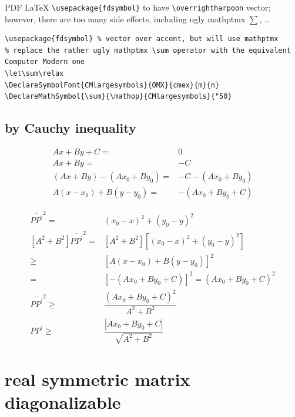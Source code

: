 \documentclass[
]{book}
\theoremstyle{definition}
\theoremstyle{definition}
\theoremstyle{definition}
\theoremstyle{definition}
\theoremstyle{remark}
\begin{document}
PDF LaTeX \texttt{\textbackslash{}usepackage\{fdsymbol\}} to have \texttt{\textbackslash{}overrightharpoon} vector; however, there are too many side effects, including ugly mathptmx \(\sum\), \ldots{}

\begin{verbatim}
\usepackage{fdsymbol} % vector over accent, but will use mathptmx
% replace the rather ugly mathptmx \sum operator with the equivalent Computer Modern one
\let\sum\relax
\DeclareSymbolFont{CMlargesymbols}{OMX}{cmex}{m}{n}
\DeclareMathSymbol{\sum}{\mathop}{CMlargesymbols}{"50}
\end{verbatim}

\hypertarget{by-cauchy-inequality}{%
\section{by Cauchy inequality}\label{by-cauchy-inequality}}

\[
\begin{aligned}
Ax+By+C= & 0\\
Ax+By= & -C\\
\left(Ax+By\right)-\left(Ax_{0}+By_{0}\right)= & -C-\left(Ax_{0}+By_{0}\right)\\
A\left(x-x_{0}\right)+B\left(y-y_{0}\right)= & -\left(Ax_{0}+By_{0}+C\right)
\end{aligned}
\]

\[
\begin{aligned}
\overline{PP^{\prime}}^{2}= & \left(x_{0}-x\right)^{2}+\left(y_{0}-y\right)^{2}\\
\left[A^{2}+B^{2}\right]\overline{PP^{\prime}}^{2}= & \left[A^{2}+B^{2}\right]\left[\left(x_{0}-x\right)^{2}+\left(y_{0}-y\right)^{2}\right]\\
\ge & \left[A\left(x-x_{0}\right)+B\left(y-y_{0}\right)\right]^{2}\\
= & \left[-\left(Ax_{0}+By_{0}+C\right)\right]^{2}=\left(Ax_{0}+By_{0}+C\right)^{2}\\
\overline{PP^{\prime}}^{2}\ge & \dfrac{\left(Ax_{0}+By_{0}+C\right)^{2}}{A^{2}+B^{2}}\\
\overline{PP^{\prime}}\ge & \dfrac{\left|Ax_{0}+By_{0}+C\right|}{\sqrt{A^{2}+B^{2}}}
\end{aligned}
\]

\hypertarget{real-symmetric-matrix-diagonalizable}{%
\chapter{real symmetric matrix diagonalizable}\label{real-symmetric-matrix-diagonalizable}}
\end{document}

